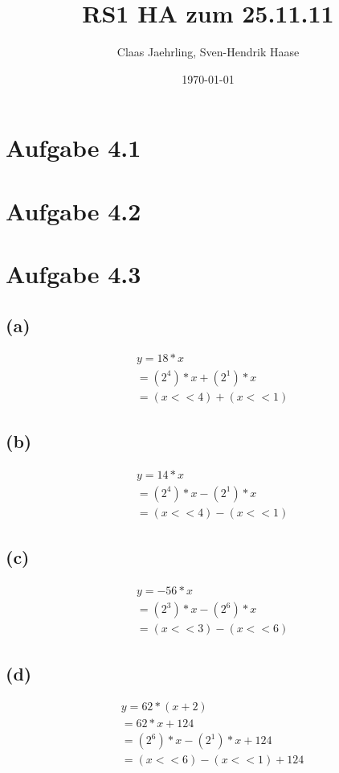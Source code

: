 \documentclass[12pt]{article}
\author{Claas Jaehrling, Sven-Hendrik Haase}
\title{RS1 HA zum 25.11.11}
\date{\today}
\begin{document}
\setcounter{secnumdepth}{0}
\maketitle

\section{Aufgabe 4.1}


\section{Aufgabe 4.2}


\section{Aufgabe 4.3}
\subsection{(a)}
\begin{align}
&y = 18 * x\\
&= (2^4) * x + (2^1) * x\\
&= (x << 4) + (x << 1)
\end{align}
\subsection{(b)}
\begin{align}
&y = 14 * x\\
&= (2^4) * x - (2^1) * x\\
&= (x << 4) - (x << 1)
\end{align}
\subsection{(c)}
\begin{align}
&y = -56 * x\\
&= (2^3) * x - (2^6) * x\\
&= (x << 3) - (x << 6)
\end{align}
\subsection{(d)}
\begin{align}
&y = 62 * (x + 2)\\
&= 62 * x + 124\\
&= (2^6) * x - (2^1) * x + 124\\
&= (x << 6) - (x << 1) + 124
\end{align}
\end{document}
